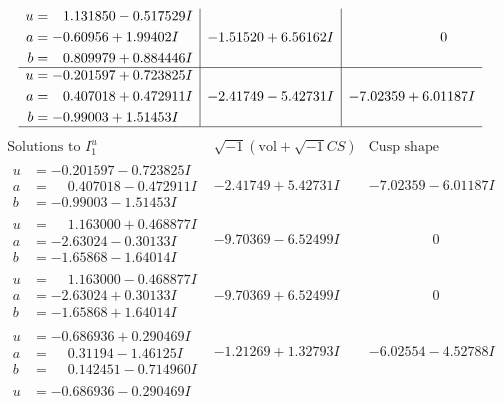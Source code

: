 \documentclass[1p]{elsarticle_modified}
\theoremstyle{definition}
\newcommand{\I}{\sqrt{-1}}
\begin{document}
$$\begin{array}{c|c|c}
\begin{aligned}
u &= \phantom{-}1.131850 - 0.517529 I \\
a &= -0.60956 + 1.99402 I \\
b &= \phantom{-}0.809979 + 0.884446 I\end{aligned}
 & -1.51520 + 6.56162 I & \phantom{-0.000000 } 0 \\ \hline\begin{aligned}
u &= -0.201597 + 0.723825 I \\
a &= \phantom{-}0.407018 + 0.472911 I \\
b &= -0.99003 + 1.51453 I\end{aligned}
 & -2.41749 - 5.42731 I & -7.02359 + 6.01187 I\\
 \hline 
 \end{array}$$\newpage$$\begin{array}{c|c|c}  
\text{Solutions to }I^u_{1}& \I (\text{vol} + \sqrt{-1}CS) & \text{Cusp shape}\\
 \hline 
\begin{aligned}
u &= -0.201597 - 0.723825 I \\
a &= \phantom{-}0.407018 - 0.472911 I \\
b &= -0.99003 - 1.51453 I\end{aligned}
 & -2.41749 + 5.42731 I & -7.02359 - 6.01187 I \\ \hline\begin{aligned}
u &= \phantom{-}1.163000 + 0.468877 I \\
a &= -2.63024 - 0.30133 I \\
b &= -1.65868 - 1.64014 I\end{aligned}
 & -9.70369 - 6.52499 I & \phantom{-0.000000 } 0 \\ \hline\begin{aligned}
u &= \phantom{-}1.163000 - 0.468877 I \\
a &= -2.63024 + 0.30133 I \\
b &= -1.65868 + 1.64014 I\end{aligned}
 & -9.70369 + 6.52499 I & \phantom{-0.000000 } 0 \\ \hline\begin{aligned}
u &= -0.686936 + 0.290469 I \\
a &= \phantom{-}0.31194 - 1.46125 I \\
b &= \phantom{-}0.142451 - 0.714960 I\end{aligned}
 & -1.21269 + 1.32793 I & -6.02554 - 4.52788 I \\ \hline\begin{aligned}
u &= -0.686936 - 0.290469 I \\

\end{aligned}
\end{array}$$
\end{document}
